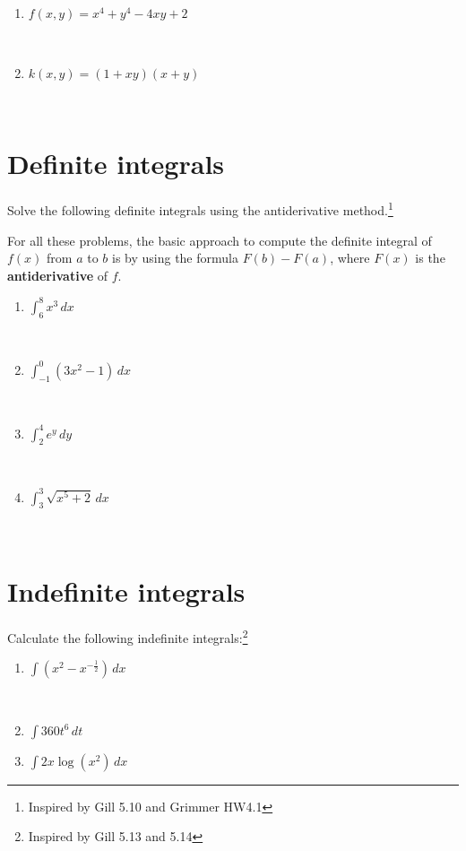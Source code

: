 \documentclass[
]{article}
\begin{document}
\begin{enumerate}
\def\labelenumi{\alph{enumi}.}
\item
  \(f(x,y) = x^4 + y^4 - 4xy + 2\)

  ~ ~ ~\\
\item
  \(k(x,y) = (1+xy)(x+y)\)

  ~\\
  \newpage
\end{enumerate}

\section{Definite integrals}\label{definite-integrals}

Solve the following definite integrals using the antiderivative
method.\footnote{Inspired by Gill 5.10 and Grimmer HW4.1}

For all these problems, the basic approach to compute the definite
integral of \(f(x)\) from \(a\) to \(b\) is by using the formula
\(F(b) - F(a)\), where \(F(x)\) is the \textbf{antiderivative} of \(f\).

\begin{enumerate}
\def\labelenumi{\alph{enumi}.}
\item
  \(\int_6^8 x^3 \,dx\)

  ~\\
\item
  \(\int_{-1}^{0} (3x^2 -1) \,dx\)

  ~\\
\item
  \(\int_2^4 e^y \,dy\)

  ~\\
\item
  \(\int_3^3 \sqrt{x^5 + 2} \,dx\)

  ~\\
\end{enumerate}

\section{Indefinite integrals}\label{indefinite-integrals}

Calculate the following indefinite integrals:\footnote{Inspired by Gill
  5.13 and 5.14}

\begin{enumerate}
\def\labelenumi{\alph{enumi}.}
\item
  \(\int (x^2-x^{-\frac{1}{2}}) \,dx\)

  ~\\
\item
  \(\int 360t^6 \,dt\)
\item
  \(\int 2x\log(x^2) \,dx\)
\end{enumerate}
\end{document}
